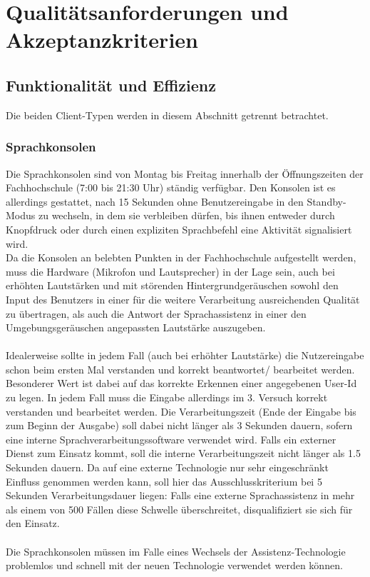 \documentclass[12pt, a4paper]{scrartcl}
\begin{document}
\section{Qualitätsanforderungen und Akzeptanzkriterien}

\subsection{Funktionalität und Effizienz}
Die beiden Client-Typen werden in diesem Abschnitt getrennt betrachtet.
\subsubsection{Sprachkonsolen}
Die Sprachkonsolen sind von Montag bis Freitag innerhalb der Öffnungszeiten der Fachhochschule (7:00 bis 21:30 Uhr) ständig verfügbar. Den Konsolen ist es allerdings gestattet, nach 15 Sekunden ohne Benutzereingabe in den Standby-Modus zu wechseln, in dem sie verbleiben dürfen, bis ihnen entweder durch Knopfdruck oder durch einen expliziten Sprachbefehl eine Aktivität signalisiert wird.\\
Da die Konsolen an belebten Punkten in der Fachhochschule aufgestellt werden, muss die Hardware (Mikrofon und Lautsprecher) in der Lage sein, auch bei erhöhten Lautstärken und mit störenden Hintergrundgeräuschen sowohl den Input des Benutzers in einer für die weitere Verarbeitung ausreichenden Qualität zu übertragen, als auch die Antwort der Sprachassistenz in einer den Umgebungsgeräuschen angepassten Lautstärke auszugeben.\\
\\
Idealerweise sollte in jedem Fall (auch bei erhöhter Lautstärke) die Nutzereingabe schon beim ersten Mal verstanden und korrekt beantwortet/ bearbeitet werden. Besonderer Wert ist dabei auf das korrekte Erkennen einer angegebenen User-Id zu legen. In jedem Fall muss die Eingabe allerdings im 3. Versuch korrekt verstanden und bearbeitet werden. Die Verarbeitungszeit (Ende der Eingabe bis zum Beginn der Ausgabe) soll dabei nicht länger als 3 Sekunden dauern, sofern eine interne Sprachverarbeitungssoftware verwendet wird. Falls ein externer Dienst zum Einsatz kommt, soll die interne Verarbeitungszeit nicht länger als 1.5 Sekunden dauern. Da auf eine externe Technologie nur sehr eingeschränkt Einfluss genommen werden kann, soll hier das Ausschlusskriterium bei 5 Sekunden Verarbeitungsdauer liegen: Falls eine externe Sprachassistenz in mehr als einem von 500 Fällen diese Schwelle überschreitet, disqualifiziert sie sich für den Einsatz.\\
\\
Die Sprachkonsolen müssen im Falle eines Wechsels der Assistenz-Technologie problemlos und schnell mit der neuen Technologie verwendet werden können.
\end{document}
